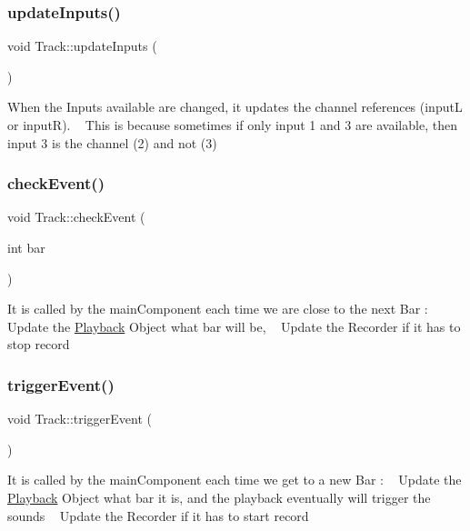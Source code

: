 \subsubsection{\texorpdfstring{updateInputs()}{updateInputs()}}
{\footnotesize\ttfamily void Track\+::update\+Inputs (\begin{DoxyParamCaption}{ }\end{DoxyParamCaption})}

When the Inputs available are changed, it updates the channel references (inputL or inputR). ~\newline
 This is because sometimes if only input 1 and 3 are available, then input 3 is the channel (2) and not (3) \mbox{\label{class_track_afc1af9074d7a5c729b787e35fef2ba8b}} 
\subsubsection{\texorpdfstring{checkEvent()}{checkEvent()}}
{\footnotesize\ttfamily void Track\+::check\+Event (\begin{DoxyParamCaption}\item[{int}]{bar }\end{DoxyParamCaption})}

It is called by the main\+Component each time we are close to the next Bar \+: ~\newline
 Update the \mbox{\hyperlink{class_playback}{Playback}} Object what bar will be, ~\newline
 Update the Recorder if it has to stop record \mbox{\label{class_track_aeae974f2aacaf6f9139a2cfc12a67e8e}} 
\subsubsection{\texorpdfstring{triggerEvent()}{triggerEvent()}}
{\footnotesize\ttfamily void Track\+::trigger\+Event (\begin{DoxyParamCaption}{ }\end{DoxyParamCaption})}

It is called by the main\+Component each time we get to a new Bar \+: ~\newline
 Update the \mbox{\hyperlink{class_playback}{Playback}} Object what bar it is, and the playback eventually will trigger the sounds ~\newline
 Update the Recorder if it has to start record \mbox{\label{class_track_af1861edf6919ed15f3a370fe1069d1ec}} 
